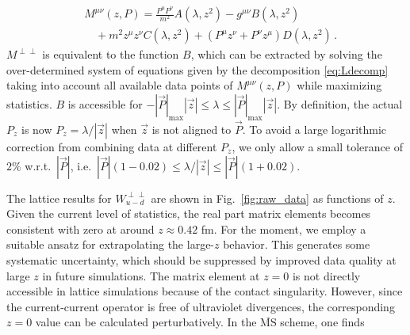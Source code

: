 \documentclass[floatfix,twocolumn,prl,showpacs,preprintnumbers,amsmath,nofootinbib,amssymb,noeprint,superscriptaddress]{revtex4-1}
\newcommand{\RZ}[1]{{\color{blue} [RZ: #1]}}
\newcommand{\CZ}[1]{{\color{orange} [CZ: #1]}}
\begin{document}
\begin{align}
    &M^{\mu\nu}(z,P)
    =
    \frac{P^\mu P^\nu}{m^2} A(\lambda,z^2)
    -
    g^{\mu\nu} B(\lambda,z^2)
    \nonumber\\
    &\quad+
    m^2 z^\mu z^\nu C(\lambda,z^2)
    +
    (P^\mu z^\nu + P^\nu z^\mu) D(\lambda,z^2)\,.
    \label{eq:Ldecomp}
\end{align}
%
$M^{\perp\perp}$ is equivalent to the function $B$, which can be extracted by solving the over-determined system of equations given by the decomposition \eqref{eq:Ldecomp} taking into account all available data points of $M^{\mu\nu}(z,P)$ while maximizing statistics. $B$ is accessible for $-|\vec{P}|_{\mathrm{max}}|\vec{z}| \le \lambda \le |\vec{P}|_{\mathrm{max}}|\vec{z}|$. 
By definition, the actual $P_z$ is now $P_z=\lambda/|\vec{z}|$ when $\vec{z}$ is not aligned to $\vec{P}$. To avoid a large logarithmic correction from combining data at different $P_z$, we only allow a small tolerance of $2\%$ w.r.t.\ $|\vec{P}|$, i.e.\ $|\vec{P}|(1-0.02) \le \lambda/|\vec{z}| \le |\vec{P}|(1+0.02)$.

The lattice results for $W^{\perp\perp}_{u-d}$ are shown in 
Fig.~\ref{fig:raw_data} as functions of $z$. Given the current level of statistics, the real part matrix elements becomes consistent with zero at around $z\approx 0.42$ fm. For the moment, we employ a suitable ansatz for extrapolating the large-$z$ behavior. This generates some systematic uncertainty, which should be suppressed by improved data quality at large $z$ in future simulations.
The matrix element at $z=0$ is not directly accessible in lattice 
simulations because of the contact singularity. However, since the 
current-current operator is free of ultraviolet divergences, the 
corresponding $z=0$ value can be calculated perturbatively. In the 
$\overline{\mathrm{MS}}$ scheme, one finds 
\end{document}
